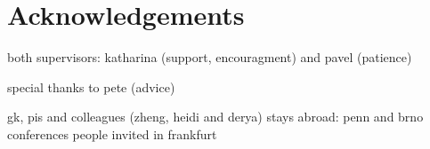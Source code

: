 \chapter*[Acknowledgements]{Acknowledgements}

both supervisors: katharina (support, encouragment) and pavel (patience)

special thanks to pete (advice)

gk, pis and colleagues (zheng, heidi and derya)
stays abroad: penn and brno
conferences
people invited in frankfurt

